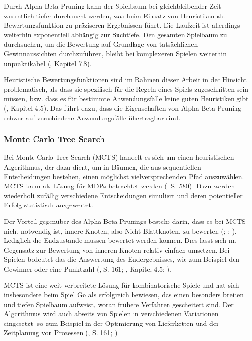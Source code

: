 Durch Alpha-Beta-Pruning kann der Spielbaum bei gleichbleibender Zeit wesentlich tiefer durchsucht werden, was beim Einsatz von Heuristiken als Bewertungsfunktion zu präziseren Ergebnissen führt. Die Laufzeit ist allerdings weiterhin exponentiell abhängig zur Suchtiefe. Den gesamten Spielbaum zu durchsuchen, um die Bewertung auf Grundlage von tatsächlichen Gewinnaussichten durchzuführen, bleibt bei komplexeren Spielen weiterhin unpraktikabel (\cite{Heineman.October2008}, Kapitel 7.8).

Heuristische Bewertungsfunktionen sind im Rahmen dieser Arbeit in der Hinsicht problematisch, als dass sie spezifisch für die Regeln eines Spiels zugeschnitten sein müssen, bzw. dass es für bestimmte Anwendungsfälle keine guten Heuristiken gibt (\cite{Ferguson.January2019}, Kapitel 4.5). Das führt dazu, dass die Eigenschaften von Alpha-Beta-Pruning schwer auf verschiedene Anwendungsfälle übertragbar sind.

\subsubsection{Monte Carlo Tree Search}

Bei Monte Carlo Tree Search (MCTS) handelt es sich um einen heuristischen Algorithmus, der dazu dient, um in Bäumen, die aus sequentiellen Entscheidungen bestehen, einen möglichst vielversprechenden Pfad auszuwählen. MCTS kann als Lösung für MDPs betrachtet werden (\cite{Russell.2020}, S. 580). Dazu werden wiederholt zufällig verschiedene Entscheidungen simuliert und deren potentieller Erfolg statistisch ausgewertet.

Der Vorteil gegenüber des Alpha-Beta-Prunings besteht darin, dass es bei MCTS nicht notwendig ist, innere Knoten, also Nicht-Blattknoten, zu bewerten (\cite{Russell.2020}; \cite{Ferguson.January2019}; \cite{Browne.2012}). Lediglich die Endzustände müssen bewertet werden können. Dies lässt sich im Gegensatz zur Bewertung von inneren Knoten relativ einfach umsetzen. Bei Spielen bedeutet das die Auswertung des Endergebnisses, wie zum Beispiel den Gewinner oder eine Punktzahl (\cite{Russell.2020}, S. 161; \cite{Ferguson.January2019}, Kapitel 4.5; \cite{Browne.2012}).

MCTS ist eine weit verbreitete Lösung für kombinatorische Spiele und hat sich insbesondere beim Spiel Go als erfolgreich bewiesen, das einen besonders breiten und tiefen Spielbaum aufweist, woran frühere Verfahren gescheitert sind. Der Algorithmus wird auch abseits von Spielen in verschiedenen Variationen eingesetzt, so zum Beispiel in der Optimierung von Lieferketten und der Zeitplanung von Prozessen (\cite{Russell.2020}, S. 161; \cite{Browne.2012}).


